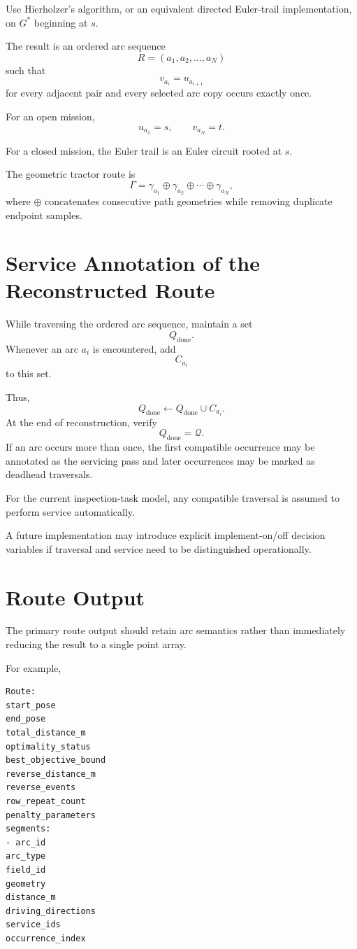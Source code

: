 \documentclass{article}
\begin{document}
Use Hierholzer's algorithm, or an equivalent directed Euler-trail implementation, on $G^*$ beginning at $s$.

The result is an ordered arc sequence
$$
R =
(a_1,a_2,\ldots,a_N)
$$
such that
$$
v_{a_i}=u_{a_{i+1}}
$$
for every adjacent pair and every selected arc copy occurs exactly once.

For an open mission,
$$
u_{a_1}=s,
\qquad
v_{a_N}=t.
$$

For a closed mission, the Euler trail is an Euler circuit rooted at $s$.

The geometric tractor route is
$$
\Gamma
=
\gamma_{a_1}
\oplus
\gamma_{a_2}
\oplus
\cdots
\oplus
\gamma_{a_N},
$$
where $\oplus$ concatenates consecutive path geometries while removing duplicate endpoint samples.

\section{Service Annotation of the Reconstructed Route}

While traversing the ordered arc sequence, maintain a set
$$
Q_{\mathrm{done}}.
$$
Whenever an arc $a_i$ is encountered, add
$$
C_{a_i}
$$
to this set.

Thus,
$$
Q_{\mathrm{done}}
\leftarrow
Q_{\mathrm{done}}\cup C_{a_i}.
$$
At the end of reconstruction, verify
$$
Q_{\mathrm{done}}=\mathcal{Q}.
$$
If an arc occurs more than once, the first compatible occurrence may be annotated as the servicing pass and later occurrences may be marked as deadhead traversals.

For the current inspection-task model, any compatible traversal is assumed to perform service automatically.

A future implementation may introduce explicit implement-on/off decision variables if traversal and service need to be distinguished operationally.

\section{Route Output}

The primary route output should retain arc semantics rather than immediately reducing the result to a single point array.

For example,

\begin{verbatim}
Route:
start_pose
end_pose
total_distance_m
optimality_status
best_objective_bound
reverse_distance_m
reverse_events
row_repeat_count
penalty_parameters
segments:
- arc_id
arc_type
field_id
geometry
distance_m
driving_directions
service_ids
occurrence_index
\end{verbatim}
\end{document}
